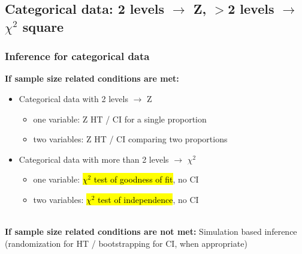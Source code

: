 \documentclass[11pt,containsverbatim,handout,xcolor=xelatex,dvipsnames,table]{beamer}
\begin{document}

\subsection{Categorical data: 2 levels $\rightarrow$ Z, $>$2 levels $\rightarrow$ $\chi^2$ square}
\label{mi1}


\begin{frame}
\frametitle{Inference for categorical data}

\textbf{If sample size related conditions are met:}

\pause

\begin{itemize}

\item Categorical data with 2 levels $\rightarrow$ Z

\pause

\begin{itemize}
\item one variable: Z HT  / CI for a single proportion
\item two variables: Z HT  / CI  comparing two proportions
\end{itemize} 

\pause

\item Categorical data with more than 2 levels $\rightarrow$ $\chi^2$

\pause

\begin{itemize}
\item one variable: \hl{$\chi^2$ test of goodness of fit}, no CI
\item two variables: \hl{$\chi^2$ test of independence}, no CI
\end{itemize} 

\end{itemize}

\pause
$\:$ \\

\textbf{If sample size related conditions are not met:} \pause Simulation based inference (randomization for HT / bootstrapping for CI, when appropriate)

\end{frame}

\end{document}

